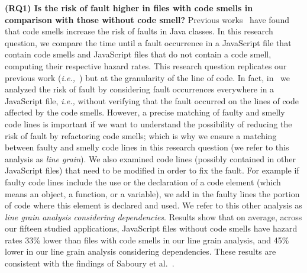\documentclass[smallcondensed]{svjour3}
\newcommand{\ie}{{\textit{i.e.,}}}
\begin{document}
\textbf{(RQ1) Is the risk of fault higher in files with code smells in comparison with those without code smell?}
Previous works~\cite{Khomh2012,jaafar2013mining} have found that code smells increase the risk of faults in Java classes. In this research question, we compare the time until a fault occurrence in a JavaScript file that contain code smells and JavaScript files that do not contain a code smell, computing their respective hazard rates. {\color{blue} This research question replicates our previous work (\ie{}~\cite{saboury2017empirical}) but at the granularity of the line of code. In fact, in~\cite{saboury2017empirical} we analyzed the risk of fault by considering fault occurrences everywhere in a JavaScript file, \ie{} without verifying that the fault occurred on the lines of code affected by the code smells. However, a precise matching of faulty and smelly code lines is important if we want to understand the possibility of reducing the risk of fault by refactoring code smells; which is why we ensure a matching between faulty and smelly code lines in this research question (we refer to this analysis as \emph{line grain}). We also examined code lines (possibly contained in other JavaScript files) that need to be modified in order to fix the fault. For example if faulty code lines include the use or the declaration of a code element (which means an object, a function, or a variable), we add in the faulty lines the portion of code where this element is declared and used. We refer to this other analysis as \emph{line grain analysis considering dependencies}. %
Results show that on average, across our fifteen studied applications, JavaScript files without code smells have hazard rates 33\% lower than files with code smells in our line grain analysis, and 45\% lower in our line grain analysis considering dependencies. These results are consistent with the findings of Saboury et al.~\cite{saboury2017empirical}}.
\end{document}
